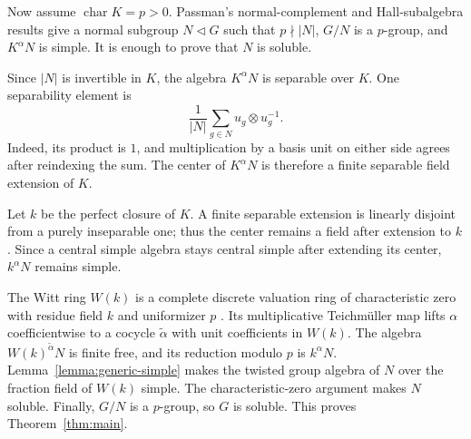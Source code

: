 \documentclass[11pt,a4paper]{amsart}
\theoremstyle{remark}
\numberwithin{equation}{section}
\begin{document}
Now assume $\operatorname{char}K=p>0$.
Passman's normal-complement and Hall-subalgebra results
\cite[Lemmas~2.6(ii) and~2.7]{Passman} give a normal subgroup
$N\triangleleft G$ such that $p\nmid|N|$, $G/N$ is a $p$-group,
and $K^\alpha N$ is simple. It is enough to prove that $N$ is
soluble.

Since $|N|$ is invertible in $K$, the algebra $K^\alpha N$ is
separable over $K$. One separability element is
\[
 \frac1{|N|}\sum_{g\in N}u_g\otimes u_g^{-1}.
\]
Indeed, its product is $1$, and multiplication by a basis unit
on either side agrees after reindexing the sum. The center of
$K^\alpha N$ is therefore a finite separable field extension
of $K$.

Let $k$ be the perfect closure of $K$. A finite separable
extension is linearly disjoint from a purely inseparable one;
thus the center remains a field after extension to $k$.
Since a central simple algebra stays central simple after
extending its center, $k^\alpha N$ remains simple.

The Witt ring $W(k)$ is a complete discrete valuation ring
of characteristic zero with residue field $k$ and uniformizer
$p$ \cite[Chapter~II]{Serre}. Its multiplicative Teichm\"uller map lifts $\alpha$
coefficientwise to a cocycle $\widetilde\alpha$ with unit
coefficients in $W(k)$. The algebra
$W(k)^{\widetilde\alpha}N$ is finite free, and its reduction
modulo $p$ is $k^\alpha N$.
Lemma~\ref{lemma:generic-simple} makes the twisted group algebra
of $N$ over the fraction field of $W(k)$ simple.
The characteristic-zero argument makes $N$ soluble.
Finally, $G/N$ is a $p$-group, so $G$ is soluble.
This proves Theorem~\ref{thm:main}.
\end{document}
